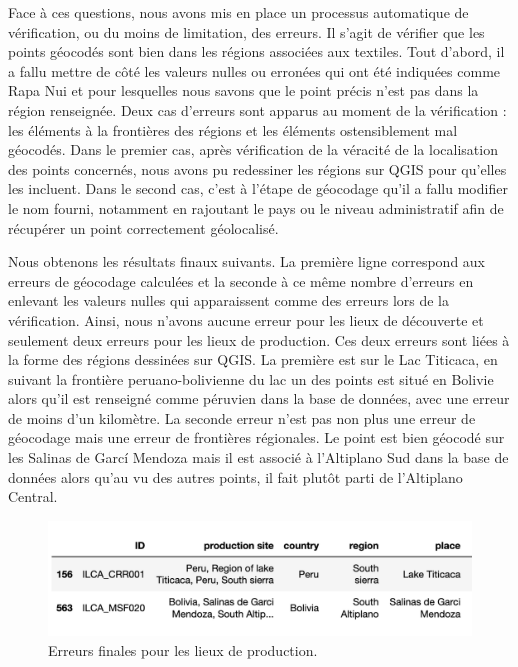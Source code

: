 Face à ces questions, nous avons mis en place un processus automatique de vérification, ou du moins de limitation, des erreurs. Il s'agit de vérifier que les points géocodés sont bien dans les régions associées aux textiles. Tout d'abord, il a fallu mettre de côté les valeurs nulles ou erronées qui ont été indiquées comme \og Rapa Nui \fg \:et pour lesquelles nous savons que le point précis n'est pas dans la région renseignée. Deux cas d'erreurs sont apparus au moment de la vérification : les éléments à la frontières des régions et les éléments ostensiblement mal géocodés. Dans le premier cas, après vérification de la véracité de la localisation des points concernés, nous avons pu redessiner les régions sur QGIS pour qu'elles les incluent. Dans le second cas, c'est à l'étape de géocodage qu'il a fallu modifier le nom fourni, notamment en rajoutant le pays ou le niveau administratif afin de récupérer un point correctement géolocalisé.

Nous obtenons les résultats finaux suivants. La première ligne correspond aux erreurs de géocodage calculées et la seconde à ce même nombre d'erreurs en enlevant les valeurs nulles qui apparaissent comme des erreurs lors de la vérification. Ainsi, nous n'avons aucune erreur pour les lieux de découverte et seulement deux erreurs pour les lieux de production. Ces deux erreurs sont liées à la forme des régions dessinées sur QGIS. La première est sur le Lac Titicaca, en suivant la frontière peruano-bolivienne du lac un des points est situé en Bolivie alors qu'il est renseigné comme péruvien dans la base de données, avec une erreur de moins d'un kilomètre. La seconde erreur n'est pas non plus une erreur de géocodage mais une erreur de frontières régionales. Le point est bien géocodé sur les Salinas de Garcí Mendoza mais il est associé à l'Altiplano Sud dans la base de données alors qu'au vu des autres points, il fait plutôt parti de l'Altiplano Central.

\clearpage
  
 \begin{figure}[!h]
	\begin{center}
		\includegraphics[width=12cm]{../images/verif_prod3bis.png}
		\caption{Erreurs finales pour les lieux de production.}
		\label{fig:erreur_verif}
	 \end{center}
\end{figure}

